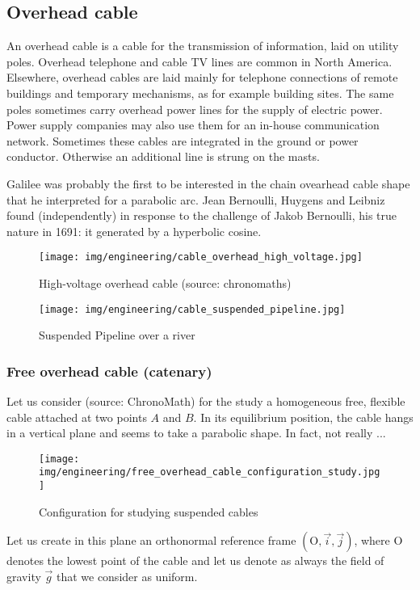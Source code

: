 	\pagebreak
	\subsection{Overhead cable}
	An overhead cable is a cable for the transmission of information, laid on utility poles. Overhead telephone and cable TV lines are common in North America. Elsewhere, overhead cables are laid mainly for telephone connections of remote buildings and temporary mechanisms, as for example building sites. The same poles sometimes carry overhead power lines for the supply of electric power. Power supply companies may also use them for an in-house communication network. Sometimes these cables are integrated in the ground or power conductor. Otherwise an additional line is strung on the masts.
	
	Galilee was probably the first to be interested in the chain ovearhead cable shape that he interpreted for a parabolic arc. Jean Bernoulli, Huygens and Leibniz found (independently) in response to the challenge of Jakob Bernoulli, his true nature in 1691: it generated by a hyperbolic cosine.
	\begin{figure}[H]
		\centering
		\texttt{[image: img/engineering/cable\_overhead\_high\_voltage.jpg]}
		\caption[High-voltage overhead cable]{High-voltage overhead cable (source: chronomaths)}
	\end{figure}
	\begin{figure}[H]
		\centering
		\texttt{[image: img/engineering/cable\_suspended\_pipeline.jpg]}
		\caption[]{Suspended Pipeline over a river}
	\end{figure}
	
	
	\pagebreak
	\subsubsection{Free overhead cable (catenary)}
	Let us consider (source: ChronoMath) for the study a homogeneous free, flexible cable attached at two points $A$ and $B$. In its equilibrium position, the cable hangs in a vertical plane and seems to take a parabolic shape. In fact, not really ...
	\begin{figure}[H]
		\centering
		\texttt{[image: img/engineering/free\_overhead\_cable\_configuration\_study.jpg]}
		\caption{Configuration for studying suspended cables}
	\end{figure}
	Let us create in this plane an orthonormal reference frame $(\text{O},\vec{i},\vec{j})$, where O denotes the lowest point of the cable and let us denote as always the field of gravity $\vec{g}$ that we consider as uniform.

